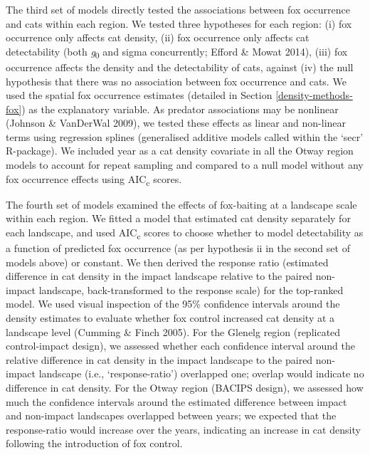 \documentclass[11pt,a4paper,titlepage,twoside,openright]{style/unimelbthesis}
\begin{document}
\begin{mainmatter}
The third set of models directly tested the associations between fox occurrence and cats within each region. We tested three hypotheses for each region: (i) fox occurrence only affects cat density, (ii) fox occurrence only affects cat detectability (both \emph{g}\textsubscript{0} and sigma concurrently; Efford \& Mowat 2014), (iii) fox occurrence affects the density and the detectability of cats, against (iv) the null hypothesis that there was no association between fox occurrence and cats. We used the spatial fox occurrence estimates (detailed in Section \ref{density-methods-fox}) as the explanatory variable. As predator associations may be nonlinear (Johnson \& VanDerWal 2009), we tested these effects as linear and non-linear terms using regression splines (generalised additive models called within the `secr' R-package). We included year as a cat density covariate in all the Otway region models to account for repeat sampling and compared to a null model without any fox occurrence effects using AIC\textsubscript{c} scores.

The fourth set of models examined the effects of fox-baiting at a landscape scale within each region. We fitted a model that estimated cat density separately for each landscape, and used AIC\textsubscript{c} scores to choose whether to model detectability as a function of predicted fox occurrence (as per hypothesis ii in the second set of models above) or constant. We then derived the response ratio (estimated difference in cat density in the impact landscape relative to the paired non-impact landscape, back-transformed to the response scale) for the top-ranked model. We used visual inspection of the 95\% confidence intervals around the density estimates to evaluate whether fox control increased cat density at a landscape level (Cumming \& Finch 2005). For the Glenelg region (replicated control-impact design), we assessed whether each confidence interval around the relative difference in cat density in the impact landscape to the paired non-impact landscape (i.e., `response-ratio') overlapped one; overlap would indicate no difference in cat density. For the Otway region (BACIPS design), we assessed how much the confidence intervals around the estimated difference between impact and non-impact landscapes overlapped between years; we expected that the response-ratio would increase over the years, indicating an increase in cat density following the introduction of fox control.

\newpage

\(~\)


\end{mainmatter}
\end{document}
